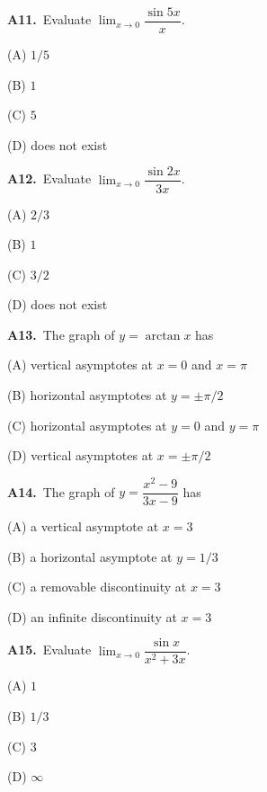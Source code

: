 \documentclass[11pt]{article}
\begin{document}
\bigskip\noindent\textbf{A11.}\ Evaluate $\displaystyle\lim_{x\to 0}\dfrac{\sin5x}{x}$.
\begin{list}{}{\setlength{\leftmargin}{3em}\setlength{\labelwidth}{2.5em}\setlength{\itemsep}{0pt}\setlength{\topsep}{2pt}}
\item[(A)] $1/5$
\item[(B)] $1$
\item[(C)] $5$
\item[(D)] does not exist
\end{list}

\bigskip\noindent\textbf{A12.}\ Evaluate $\displaystyle\lim_{x\to 0}\dfrac{\sin2x}{3x}$.
\begin{list}{}{\setlength{\leftmargin}{3em}\setlength{\labelwidth}{2.5em}\setlength{\itemsep}{0pt}\setlength{\topsep}{2pt}}
\item[(A)] $2/3$
\item[(B)] $1$
\item[(C)] $3/2$
\item[(D)] does not exist
\end{list}

\bigskip\noindent\textbf{A13.}\ The graph of $y=\arctan x$ has
\begin{list}{}{\setlength{\leftmargin}{3em}\setlength{\labelwidth}{2.5em}\setlength{\itemsep}{0pt}\setlength{\topsep}{2pt}}
\item[(A)] vertical asymptotes at $x=0$ and $x=\pi$
\item[(B)] horizontal asymptotes at $y=\pm\pi/2$
\item[(C)] horizontal asymptotes at $y=0$ and $y=\pi$
\item[(D)] vertical asymptotes at $x=\pm\pi/2$
\end{list}

\bigskip\noindent\textbf{A14.}\ The graph of $y=\dfrac{x^2-9}{3x-9}$ has
\begin{list}{}{\setlength{\leftmargin}{3em}\setlength{\labelwidth}{2.5em}\setlength{\itemsep}{0pt}\setlength{\topsep}{2pt}}
\item[(A)] a vertical asymptote at $x=3$
\item[(B)] a horizontal asymptote at $y=1/3$
\item[(C)] a removable discontinuity at $x=3$
\item[(D)] an infinite discontinuity at $x=3$
\end{list}

\bigskip\noindent\textbf{A15.}\ Evaluate $\displaystyle\lim_{x\to0}\dfrac{\sin x}{x^2+3x}$.
\begin{list}{}{\setlength{\leftmargin}{3em}\setlength{\labelwidth}{2.5em}\setlength{\itemsep}{0pt}\setlength{\topsep}{2pt}}
\item[(A)] $1$
\item[(B)] $1/3$
\item[(C)] $3$
\item[(D)] $\infty$
\end{list}
\end{document}
